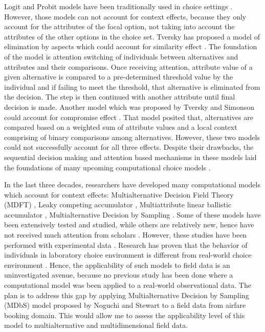 \documentclass[a4paper,12pt]{article}
\newcommand{\citeyearonly}[1]{\citeyearpar{#1}}
\begin{document}
Logit and Probit models have been traditionally used in choice settings \citep{gensch1979multinomial, kim2017probit}. However, those models can not account for context effects, because they only account for the attributes of the focal option, not taking into account the attributes of the other options in the choice set. Tversky has proposed a model of elimination by aspects which could account for similarity effect \citeyearonly{tversky1972elimination}. The foundation of the model is attention switching of individuals between alternatives and attributes and their comparisons. Once receiving attention, attribute value of a given alternative is compared to a pre-determined threshold value by the individual and if failing to meet the threshold, that alternative is eliminated from the decision. The step is then  continued with another attribute until final decision is made. Another model which was proposed by Tversky and Simonson could account for compromise effect \citeyearonly{tverskySimonson93}. That model posited that, alternatives are compared based on a weighted sum of attribute values and a local context comprising of binary comparisons among alternatives. However, these two models could not successfully account for all three effects. Despite their drawbacks, the sequential decision making and attention based mechanisms in these models laid the foundations of many upcoming computational choice models \citep{bhatia2013associations}. 

In the last three decades, researchers have developed many computational models which account for context effects: Multialternative Decision Field Theory (MDFT) \citep{roe2001multialternative}, Leaky competing
accumulator \citep{usher2001time}, Multiattribute linear ballistic accumulator \citep{trueblood2014multiattribute}, Multialternative Decision by Sampling  \citep{noguchi2018multialternative}. Some of these models have been extensively tested and studied, while others are relatively new, hence have not received much attention from scholars \citep{truebloodEtAl13}. However, these studies have been performed with experimental data \citep{trueblood2014multiattribute,  berkowitsch2014rigorously, evans2019response, busemeyer2019cognitive}. Research has proven that the behavior of individuals in laboratory choice environment is different from real-world choice environment \citep{hogarth1989risk}. Hence, the applicability of such models to field data is an uninvestigated avenue, because no previous study has been done where a computational model was been applied to a real-world observational data. The plan is to address this gap by applying Multialternative Decision by Sampling (MDbS) model proposed by Noguchi and Stewart \citeyearonly{noguchi2018multialternative} to a field data from airfare booking domain. This would allow me to assess the applicability level of this model to multialternative and multidimensional field data. 
\end{document}
